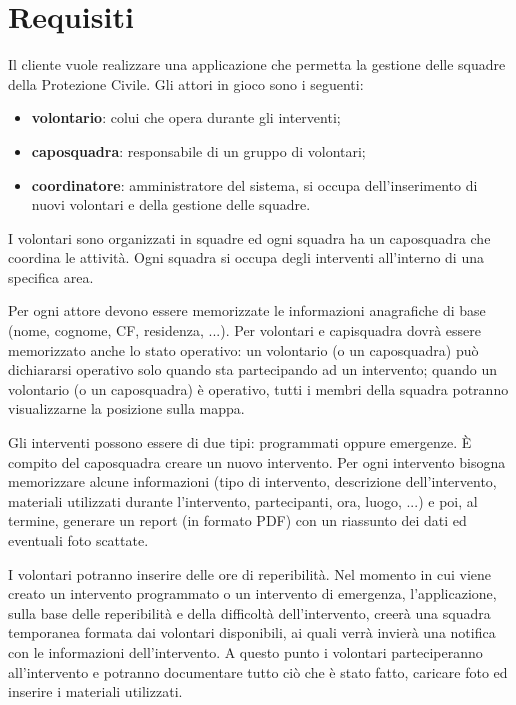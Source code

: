 \section{Requisiti}

Il cliente vuole realizzare una applicazione che permetta la gestione delle squadre della Protezione Civile.  
Gli attori in gioco sono i seguenti: 
\begin{itemize}
	\item \textbf{volontario}: colui che opera durante gli interventi; 
	\item \textbf{caposquadra}: responsabile di un gruppo di volontari; 
	\item \textbf{coordinatore}: amministratore del sistema, si occupa dell'inserimento di nuovi volontari e della gestione delle squadre.
\end{itemize}

I volontari sono organizzati in squadre ed ogni squadra ha un caposquadra che coordina le attività. Ogni squadra si occupa degli interventi all’interno di una specifica area.

Per ogni attore devono essere memorizzate le informazioni anagrafiche di base (nome, cognome, CF, residenza, ...). Per volontari e capisquadra dovrà essere memorizzato anche lo stato operativo: un volontario (o un caposquadra) può dichiararsi operativo solo quando sta partecipando ad un intervento; quando un volontario (o un caposquadra) è operativo, tutti i membri della squadra potranno visualizzarne la posizione sulla mappa. 

Gli interventi possono essere di due tipi: programmati oppure emergenze. È compito del caposquadra creare un nuovo intervento. Per ogni intervento bisogna memorizzare alcune informazioni (tipo di intervento, descrizione dell'intervento, materiali utilizzati durante l’intervento, partecipanti, ora, luogo, ...) e poi, al termine, generare un report (in formato PDF) con un riassunto dei dati ed eventuali foto scattate.

I volontari potranno inserire delle ore di reperibilità. Nel momento in cui viene creato un intervento programmato o un intervento di emergenza, l’applicazione, sulla base delle reperibilità e della difficoltà dell’intervento, creerà una squadra temporanea formata dai volontari disponibili, ai quali verrà invierà una notifica con le informazioni dell'intervento. A questo punto i volontari parteciperanno all’intervento e potranno documentare tutto ciò che è stato fatto, caricare foto ed inserire i materiali utilizzati.


